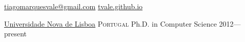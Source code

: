 \documentclass[10pt,a4paper]{article}
\begin{document}
\sloppy  %



\nobreakvspace{0.3em}  %

\noindent\href{mailto:tiagomarquesvale@gmail.com}{tiagomarquesvale\mbox{}@\mbox{}gmail.com}\sbull
\href{http://tvale.github.io}{tvale.github.io}

\spacedhrule{0.9em}{-0.4em}  %

%
%
%
%
%


\headedsection
  {\href{http://fct.unl.pt}{Universidade Nova de Lisboa}}
  {\textsc{Portugal}} {%
  \headedsubsection
    {Ph.D. in Computer Science}
    {2012---present}
    {}
}
\end{document}
